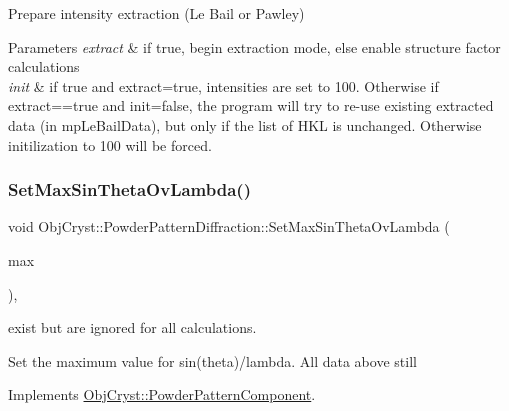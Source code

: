 Prepare intensity extraction (Le Bail or Pawley)


\begin{DoxyParams}{Parameters}
{\em extract} & if true, begin extraction mode, else enable structure factor calculations \\
\hline
{\em init} & if true and extract=true, intensities are set to 100. Otherwise if extract==true and init=false, the program will try to re-\/use existing extracted data (in mp\+Le\+Bail\+Data), but only if the list of H\+KL is unchanged. Otherwise initilization to 100 will be forced. \\
\hline
\end{DoxyParams}
\mbox{\label{class_obj_cryst_1_1_powder_pattern_diffraction_a6eabf890d810833b58a903f70dad5885}} 
\subsubsection{\texorpdfstring{SetMaxSinThetaOvLambda()}{SetMaxSinThetaOvLambda()}}
{\footnotesize\ttfamily void Obj\+Cryst\+::\+Powder\+Pattern\+Diffraction\+::\+Set\+Max\+Sin\+Theta\+Ov\+Lambda (\begin{DoxyParamCaption}\item[{const R\+E\+AL}]{max }\end{DoxyParamCaption})\hspace{0.3cm}{\ttfamily [protected]}, {\ttfamily [virtual]}}



exist but are ignored for all calculations. 

Set the maximum value for sin(theta)/lambda. All data above still 

Implements \mbox{\hyperlink{class_obj_cryst_1_1_powder_pattern_component_a4731b5a64ee9aab6779e2ef323242fe5}{Obj\+Cryst\+::\+Powder\+Pattern\+Component}}.

